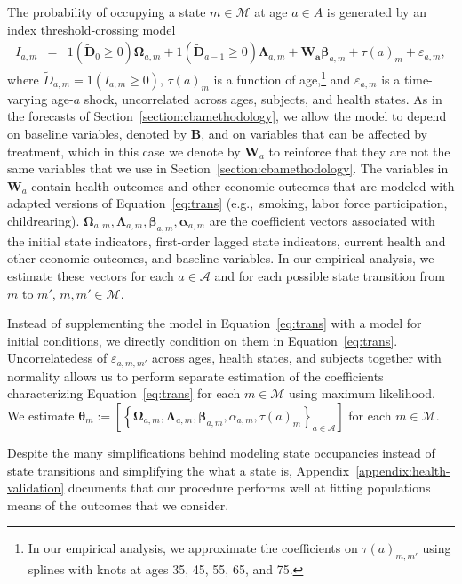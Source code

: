 The probability of occupying a state $m \in \mathcal{M}$ at age $a \in{A}$ is generated by an index threshold-crossing model
\begin{eqnarray}
I_{a,m} &=&  \bm{\mathit{1}} \left( \tilde{\bm{D}}_{0} \geq 0 \right) \bm{\Omega}_{a,m} + \bm{\mathit{1}} \left( \tilde{\bm{D}}_{a-1} \geq 0\right) \bm{\Lambda}_{a,m} + \bm{W_a} \bm{\beta}_{a,m} + \tau \left( a \right)_{m} + \varepsilon_{a,m}, \label{eq:trans}
\end{eqnarray}
where $\tilde{D}_{a,m} = \bm{\mathit{1}}  \left( I_{a,m} \geq 0 \right)$, $\tau \left( a \right)_{m}$ is a function of age,\footnote{In our empirical analysis, we approximate the coefficients on $\tau \left( a \right)_{m,m'}$ using splines with knots at ages 35, 45, 55, 65, and 75.} and $\varepsilon_{a,m}$ is a time-varying age-$a$ shock, uncorrelated across ages, subjects, and health states. As in the forecasts of Section~\ref{section:cbamethodology}, we allow the model to depend on baseline variables, denoted by $\bm{B}$, and on variables that can be affected by treatment, which in this case we denote by $\bm{W}_a$ to reinforce that they are not the same variables that we use in Section~\ref{section:cbamethodology}. The variables in $\bm{W}_a$ contain health outcomes and other economic outcomes that are modeled with adapted versions of Equation~\eqref{eq:trans} (e.g.,\ smoking, labor force participation, childrearing). $ \bm{\Omega}_{a,m},  \bm{\Lambda}_{a,m}, \bm{\beta}_{a,m},  \bm{\alpha}_{a,m}$ are the coefficient vectors associated with the initial state indicators, first-order lagged state indicators, current health and other economic outcomes, and baseline variables. In our empirical analysis, we estimate these vectors for each $a \in \mathcal{A}$ and for each possible state transition from $m$ to $m'$, $m,m' \in \mathcal{M}$.

Instead of supplementing the model in Equation~\eqref{eq:trans} with a model for initial conditions, we directly condition on them in Equation~\eqref{eq:trans}. Uncorrelatedess of $\varepsilon_{a,m,m'}$ across ages, health states, and subjects together with normality allows us to perform separate estimation of the coefficients characterizing Equation~\eqref{eq:trans} for each $m \in \mathcal{M}$ using maximum likelihood. We estimate $\bm{\theta}_m := \left[ \left\{  \bm{\Omega}_{a,m}, \bm{\Lambda}_{a,m}, \bm{\beta}_{a,m}, \alpha_{a,m}, \tau \left( a \right) _{m}  \right\}_{a \in \mathcal{A}} \right]$ for each $m \in \mathcal{M}$.

Despite the many simplifications behind modeling state occupancies instead of state transitions and simplifying the what a state is, Appendix~\ref{appendix:health-validation} documents that our procedure performs well at fitting populations means of the outcomes that we consider.

